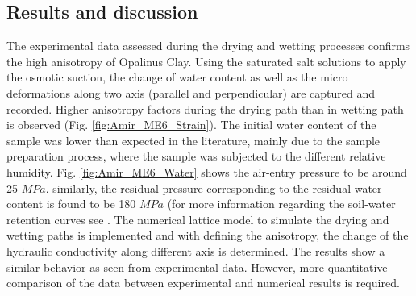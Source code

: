 \subsection{Results and discussion}
The experimental data assessed during the drying and wetting processes confirms the high anisotropy of Opalinus Clay. Using the saturated salt solutions to apply the osmotic suction, the change of water content as well as the micro deformations along two axis (parallel and perpendicular) are captured and recorded. Higher anisotropy factors during the drying path than in wetting path is observed (Fig. \ref{fig:Amir_ME6_Strain}). The initial water content of the sample was lower than expected in the literature, mainly due to the sample preparation process, where the sample was subjected to the different relative humidity. Fig. \ref{fig:Amir_ME6_Water} shows the air-entry pressure to be around 25 $MPa$. similarly, the residual pressure corresponding to the residual water content is found to be 180 $MPa$ (for more information regarding the soil-water retention curves see \cite{Sattari2020}. The numerical lattice model to simulate the drying and wetting paths is implemented and with defining the anisotropy, the change of the hydraulic conductivity along different axis is determined. The results show a similar behavior as seen from experimental data. However, more quantitative comparison of the data between experimental and numerical results is required. 